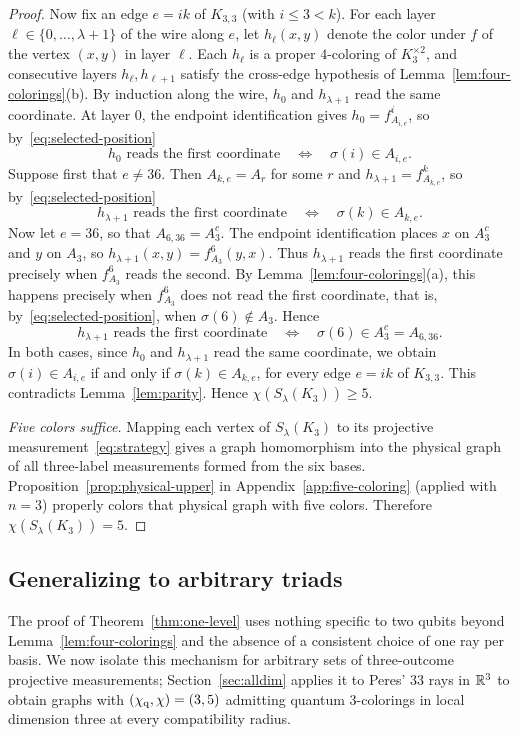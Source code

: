 \begin{proof}
Now fix an edge $e=ik$ of $K_{3,3}$ (with $i\le3<k$). For each layer $\ell\in\{0,\ldots,\lambda+1\}$ of the wire along $e$, let $h_\ell(x,y)$ denote the color under $f$ of the vertex $(x,y)$ in layer $\ell$. Each $h_\ell$ is a proper $4$-coloring of $K_3^{\times2}$, and consecutive layers $h_\ell,h_{\ell+1}$ satisfy the cross-edge hypothesis of Lemma~\ref{lem:four-colorings}(b). By induction along the wire, $h_0$ and $h_{\lambda+1}$ read the same coordinate. At layer $0$, the endpoint identification gives $h_0=f^i_{A_{i,e}}$, so by~\eqref{eq:selected-position}
\[
 h_0\text{ reads the first coordinate}\quad\Longleftrightarrow\quad\sigma(i)\in A_{i,e}.
\]
Suppose first that $e\ne36$. Then $A_{k,e}=A_r$ for some $r$ and $h_{\lambda+1}=f^k_{A_{k,e}}$, so by~\eqref{eq:selected-position}
\[
 h_{\lambda+1}\text{ reads the first coordinate}\quad\Longleftrightarrow\quad\sigma(k)\in A_{k,e}.
\]
Now let $e=36$, so that $A_{6,36}=A_3^c$. The endpoint identification places $x$ on $A_3^c$ and $y$ on $A_3$, so $h_{\lambda+1}(x,y)=f^6_{A_3}(y,x)$. Thus $h_{\lambda+1}$ reads the first coordinate precisely when $f^6_{A_3}$ reads the second. By Lemma~\ref{lem:four-colorings}(a), this happens precisely when $f^6_{A_3}$ does not read the first coordinate, that is, by~\eqref{eq:selected-position}, when $\sigma(6)\notin A_3$. Hence
\[
 h_{\lambda+1}\text{ reads the first coordinate}\quad\Longleftrightarrow\quad\sigma(6)\in A_3^c=A_{6,36}.
\]
In both cases, since $h_0$ and $h_{\lambda+1}$ read the same coordinate, we obtain $\sigma(i)\in A_{i,e}$ if and only if $\sigma(k)\in A_{k,e}$, for every edge $e=ik$ of $K_{3,3}$. This contradicts Lemma~\ref{lem:parity}. Hence $\chi(S_\lambda(K_3))\ge5$.

\emph{Five colors suffice.} Mapping each vertex of $S_\lambda(K_3)$ to its projective measurement~\eqref{eq:strategy} gives a graph homomorphism into the physical graph of all three-label measurements formed from the six bases. Proposition~\ref{prop:physical-upper} in Appendix~\ref{app:five-coloring} (applied with $n=3$) properly colors that physical graph with five colors. Therefore $\chi(S_\lambda(K_3))=5$.
\end{proof}

\subsection{Generalizing to arbitrary triads}\label{sec:one-in-three}

The proof of Theorem~\ref{thm:one-level} uses nothing specific to two qubits beyond Lemma~\ref{lem:four-colorings} and the absence of a consistent choice of one ray per basis. We now isolate this mechanism for arbitrary sets of three-outcome projective measurements; Section~\ref{sec:alldim} applies it to Peres' $33$ rays in $\mathbb R^3$ to obtain graphs with $(\chi_{\mathrm q},\chi)=(3,5)$ admitting quantum $3$-colorings in local dimension three at every compatibility radius.

